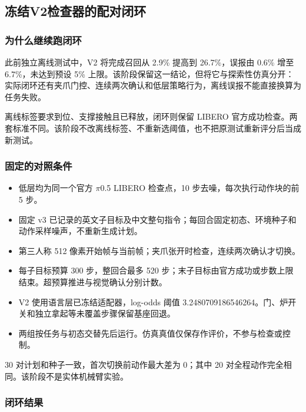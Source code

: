 \subsection{冻结V2检查器的配对闭环}\label{s12-detail-1}

\subsubsection{为什么继续跑闭环}\label{s12-detail-2}

此前独立离线测试中，V2 将完成召回从 2.9\% 提高到 26.7\%，误报由 0.6\% 增至 6.7\%，未达到预设 5\% 上限。该阶段保留这一结论，但将它与探索性仿真分开：实际闭环还有夹爪门控、连续两次确认和低层策略行为，离线误报不能直接换算为任务失败。

离线标签要求到位、支撑接触且已释放，闭环则保留 LIBERO 官方成功检查。两套标准不同。该阶段不改离线标签、不重新选阈值，也不把原测试重新评分后当成新测试。

\subsubsection{固定的对照条件}\label{s12-detail-3}

\begin{itemize}
\tightlist
\item
  低层均为同一个官方 \(\pi\)0.5 LIBERO 检查点，10 步去噪，每次执行动作块的前 5 步。
\item
  固定 v3 已记录的英文子目标及中文整句指令；每回合固定初态、环境种子和动作采样噪声，不重新生成计划。
\item
  第三人称 512 像素开始帧与当前帧；夹爪张开时检查，连续两次确认才切换。
\item
  每子目标预算 300 步，整回合最多 520 步；末子目标由官方成功或步数上限结束。超预算推进与视觉确认分别计数。
\item
  V2 使用语言层已冻结适配器，log-odds 阈值 3.2480709186546264。门、炉开关和独立拿起等未覆盖步骤保留基座回退。
\item
  两组按任务与初态交替先后运行。仿真真值仅保存作评价，不参与检查或控制。
\end{itemize}

30 对计划和种子一致，首次切换前动作最大差为 0；其中 20 对全程动作完全相同。该阶段不是实体机械臂实验。

\subsubsection{闭环结果}\label{s12-detail-4}

